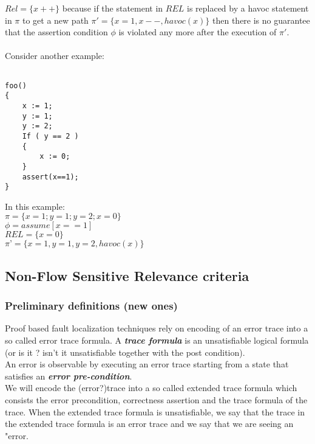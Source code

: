 \documentclass{article}
\begin{document}
$Rel =\{x++\}$ because if the statement in $REL$ is replaced by a havoc statement in $\pi$ to get a new path $\pi' =\{x=1, x--, havoc(x)\}$ then there is no guarantee that the assertion condition $\phi$ is violated any more after the execution of $\pi'$.
\\
\\
Consider another example:
\begin{lstlisting}

foo()
{
	x := 1;
	y := 1;
	y := 2;
	If ( y == 2 )
	{
		x := 0;
	}
	assert(x==1);
}

\end{lstlisting}
In this example: \\
$\pi = \{ x=1; y=1; y=2; x=0 \} $\\
$\phi = assume[x==1]$\\
$REL = \{ x=0 \}$ \\
$\pi’ = \{x=1, y=1, y=2, havoc(x)\}$

\subsection{Non-Flow Sensitive Relevance criteria }
\subsubsection{Preliminary definitions (new ones)}
Proof based fault localization techniques rely on encoding of an error trace into a so called error trace formula. A \textit{\textbf{trace formula}} is an unsatisfiable logical formula (or is it ? isn't it unsatisfiable together with the post condition).\\
An error is observable by executing an error trace starting from a state that satisfies an \textbf{\textit{error pre-condition}}.\\
We will encode the (error?)trace into a so called extended trace formula which consists the error precondition, correctness assertion and the trace formula of the trace. When the extended trace formula is unsatisfiable, we say that the trace in the extended trace formula is an error trace and we say that we are seeing an "error.
\end{document}
